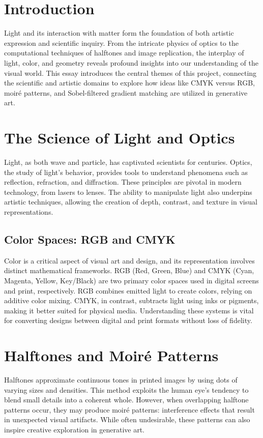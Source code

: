 \section*{Introduction}
Light and its interaction with matter form the foundation of both artistic expression and scientific inquiry. From the intricate physics of optics to the computational techniques of halftones and image replication, the interplay of light, color, and geometry reveals profound insights into our understanding of the visual world. This essay introduces the central themes of this project, connecting the scientific and artistic domains to explore how ideas like CMYK versus RGB, moir\'{e} patterns, and Sobel-filtered gradient matching are utilized in generative art.

\section*{The Science of Light and Optics}
Light, as both wave and particle, has captivated scientists for centuries. Optics, the study of light's behavior, provides tools to understand phenomena such as reflection, refraction, and diffraction. These principles are pivotal in modern technology, from lasers to lenses. The ability to manipulate light also underpins artistic techniques, allowing the creation of depth, contrast, and texture in visual representations.

\subsection*{Color Spaces: RGB and CMYK}
Color is a critical aspect of visual art and design, and its representation involves distinct mathematical frameworks. RGB (Red, Green, Blue) and CMYK (Cyan, Magenta, Yellow, Key/Black) are two primary color spaces used in digital screens and print, respectively. RGB combines emitted light to create colors, relying on additive color mixing. CMYK, in contrast, subtracts light using inks or pigments, making it better suited for physical media. Understanding these systems is vital for converting designs between digital and print formats without loss of fidelity.

\section*{Halftones and Moir\'{e} Patterns}
Halftones approximate continuous tones in printed images by using dots of varying sizes and densities. This method exploits the human eye's tendency to blend small details into a coherent whole. However, when overlapping halftone patterns occur, they may produce moir\'{e} patterns: interference effects that result in unexpected visual artifacts. While often undesirable, these patterns can also inspire creative exploration in generative art.

